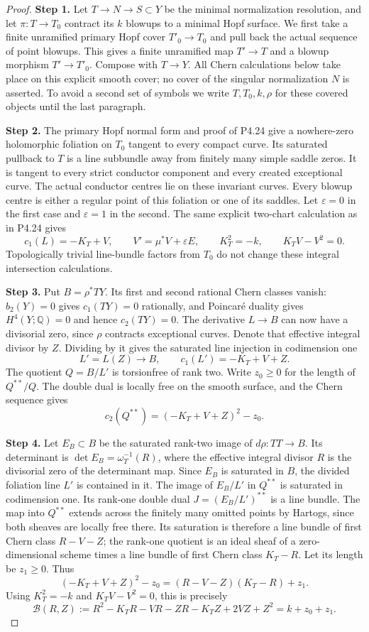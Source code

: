 \begin{proof}
\noindent\textbf{Step 1.} Let $T\to N\to S\subset Y$ be the minimal normalization
resolution, and let $\pi:T\to T_0$ contract its $k$ blowups
to a minimal Hopf surface. We first take a finite unramified
primary Hopf cover $T'_0\to T_0$ and pull back the actual
sequence of point blowups. This gives a finite unramified
map $T'\to T$ and a blowup morphism $T'\to T'_0$.
Compose with $T\to Y$. All Chern calculations below take
place on this explicit smooth cover; no cover of the
singular normalization $N$ is asserted. To avoid a second
set of symbols we write $T,T_0,k,\rho$ for these covered
objects until the last paragraph.

\noindent\textbf{Step 2.} The primary Hopf normal form and proof of P4.24 give a
nowhere-zero holomorphic foliation on $T_0$ tangent to
every compact curve. Its saturated pullback to $T$ is a
line subbundle away from finitely many simple saddle
zeros. It is tangent to every strict conductor component
and every created exceptional curve. The actual conductor
centres lie on these invariant curves. Every blowup centre
is either a regular point of this foliation or one of its
saddles. Let $\varepsilon=0$ in the first case and
$\varepsilon=1$ in the second. The same explicit two-chart
calculation as in P4.24 gives
\[
 c_1(L)=-K_T+V,\qquad
 V'=\mu^*V+\varepsilon E,
 \qquad K_T^2=-k,\qquad K_TV-V^2=0.
\]
Topologically trivial line-bundle factors from $T_0$ do
not change these integral intersection calculations.

\noindent\textbf{Step 3.} Put $B=\rho^*TY$. Its first and second rational Chern
classes vanish: $b_2(Y)=0$ gives $c_1(TY)=0$ rationally,
and Poincar\'e duality gives $H^4(Y;\mathbb Q)=0$ and
hence $c_2(TY)=0$. The derivative $L\to B$ can now have
a divisorial zero, since $\rho$ contracts exceptional
curves. Denote that effective integral divisor by $Z$.
Dividing by it gives the saturated line injection in
codimension one
\[
 L'=L(Z)\longrightarrow B,
 \qquad c_1(L')=-K_T+V+Z.
\]
The quotient $Q=B/L'$ is torsionfree of rank two.
Write $z_0\ge0$ for the length of $Q^{**}/Q$.
The double dual is locally free on the smooth surface,
and the Chern sequence gives
\[
 c_2(Q^{**})=(-K_T+V+Z)^2-z_0.
\]

\noindent\textbf{Step 4.} Let $E_B\subset B$ be the saturated rank-two image
of $d\rho:TT\to B$. Its determinant is
$\det E_B=\omega_T^{-1}(R)$, where the effective
integral divisor $R$ is the divisorial zero of the
determinant map. Since $E_B$ is saturated in $B$,
the divided foliation line $L'$ is contained in it.
The image of $E_B/L'$ in $Q^{**}$ is saturated in
codimension one. Its rank-one double dual
$J=(E_B/L')^{**}$ is a line bundle. The map into
$Q^{**}$ extends across the finitely many omitted
points by Hartogs, since both sheaves are locally
free there. Its saturation is therefore a line bundle
of first Chern class $R-V-Z$; the rank-one quotient
is an ideal sheaf of a zero-dimensional scheme
times a line bundle of first Chern class $K_T-R$.
Let its length be $z_1\ge0$. Thus
\[
 (-K_T+V+Z)^2-z_0
       =(R-V-Z)(K_T-R)+z_1.
\]
Using $K_T^2=-k$ and $K_TV-V^2=0$, this is precisely
\[
 \mathcal B(R,Z)
 :=R^2-K_TR-VR-ZR-K_TZ+2VZ+Z^2
 =k+z_0+z_1.                                      \tag{P4.36.1}
\]


\end{proof}
